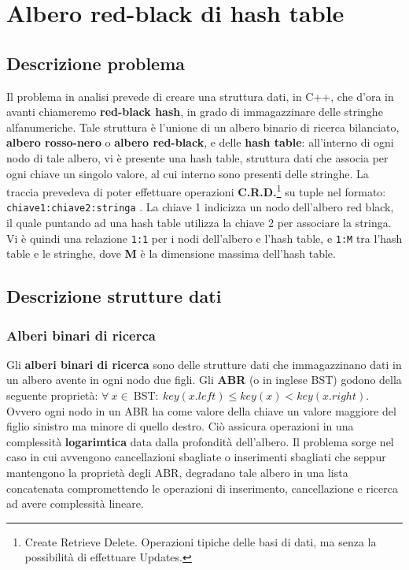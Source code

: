 \def\baselinestretch{1}
\chapter{Albero red-black di hash table}
\def\baselinestretch{1.66}
\thispagestyle{headings}

\def\baselinestretch{1}
\section{Descrizione problema}
\def\baselinestretch{1.66}
\thispagestyle{headings}

Il problema in analisi prevede di creare una struttura dati, in C++, che d'ora in avanti chiameremo
\textbf{red-black hash}, in grado di immagazzinare delle stringhe alfanumeriche. Tale struttura
\`e l'unione di un albero binario di ricerca bilanciato, \textbf{albero rosso-nero} o \textbf{albero
red-black}, e delle \textbf{hash table}: all'interno di ogni nodo di tale albero,
vi \`e presente una hash table, struttura dati che associa per ogni chiave un singolo valore, al cui
interno sono presenti delle stringhe. La traccia prevedeva di poter effettuare operazioni
\textbf{C.R.D.}\footnote{Create Retrieve Delete. Operazioni tipiche delle basi di dati, ma senza la
possibilit\`a di effettuare Updates.} su tuple nel formato: \verb|chiave1:chiave2:stringa| . 
La chiave 1 indicizza un nodo dell'albero red black, il quale puntando ad una hash
table utilizza la chiave 2 per associare la stringa.
Vi \`e quindi una relazione \verb|1:1| per i nodi dell'albero e l'hash table, e \verb|1:M| tra l'hash table
e le stringhe, dove \textbf{M} \`e la dimensione massima dell'hash table.

\def\baselinestretch{1}
\section{Descrizione strutture dati}
\def\baselinestretch{1.66}
\thispagestyle{headings}
\subsection{Alberi binari di ricerca}
\indent Gli \textbf{alberi binari di ricerca} sono delle strutture dati
 che immagazzinano dati in un albero avente in ogni nodo due 
 figli. Gli \textbf{ABR} (o in inglese BST) godono della seguente propriet\`a:
 $\forall \ x \in \ $BST$ :\ key(x.left) \leq key(x) < key(x.right)$. 
 Ovvero ogni nodo in un ABR ha come valore della chiave un valore
 maggiore del figlio sinistro ma minore di quello destro.
 \newline Ci\`o assicura operazioni in una complessit\`a 
 \textbf{logarimtica} data dalla profondit\`a dell'albero.
 Il problema sorge nel caso in cui avvengono cancellazioni
 sbagliate o inserimenti sbagliati che seppur mantengono
 la propriet\`a degli ABR, degradano tale albero in una lista concatenata
 compromettendo le operazioni di inserimento, cancellazione
 e ricerca ad avere complessit\`a lineare.

